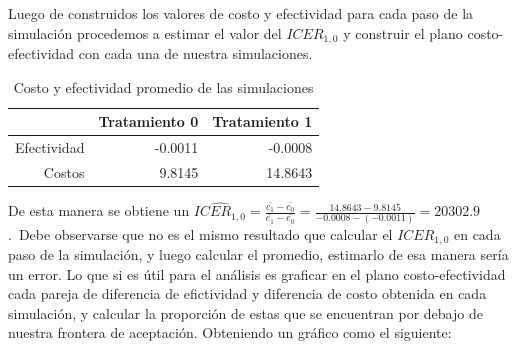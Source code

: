 \documentclass[12pt]{article}
\begin{document}
Luego de construidos los valores de costo y efectividad para cada paso de la simulación procedemos a estimar el valor del $ICER_{1,0}$ y construir el plano costo-efectividad con cada una de nuestra simulaciones.


\begin{table}[ht]
\centering
\begin{tabular}{rrr}
  \hline
 & Tratamiento 0 & Tratamiento 1 \\ 
  \hline
Efectividad & -0.0011 & -0.0008 \\ 
  Costos & 9.8145 & 14.8643 \\ 
   \hline
\end{tabular}
\caption{Costo y efectividad promedio de las simulaciones}
\label{tab:resumen_medias}
\end{table}


De esta manera se obtiene un $===20302.9$.\
Debe observarse que no es el mismo resultado que calcular el $ICER_{1,0}$ en cada paso de la simulación, y luego calcular el promedio, estimarlo de esa manera sería un error. Lo que si es útil para el análisis es graficar en el plano costo-efectividad cada pareja de diferencia de efictividad y diferencia de costo obtenida en cada simulación, y calcular la proporción de estas que se encuentran por debajo de nuestra frontera de aceptación. Obteniendo un gráfico como el siguiente:
\end{document}
